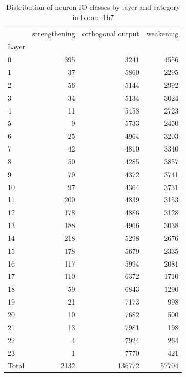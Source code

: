 \begin{table}
\caption{Distribution of neuron IO classes by layer and category in bloom-1b7}
\label{tab:bloom-1b7}
\begin{tabular}{lrrr}
 & strengthening & orthogonal output & weakening \\
Layer &  &  &  \\
0 & 395 & 3241 & 4556 \\
1 & 37 & 5860 & 2295 \\
2 & 56 & 5144 & 2992 \\
3 & 34 & 5134 & 3024 \\
4 & 11 & 5458 & 2723 \\
5 & 9 & 5733 & 2450 \\
6 & 25 & 4964 & 3203 \\
7 & 42 & 4810 & 3340 \\
8 & 50 & 4285 & 3857 \\
9 & 79 & 4372 & 3741 \\
10 & 97 & 4364 & 3731 \\
11 & 200 & 4839 & 3153 \\
12 & 178 & 4886 & 3128 \\
13 & 188 & 4966 & 3038 \\
14 & 218 & 5298 & 2676 \\
15 & 178 & 5679 & 2335 \\
16 & 117 & 5994 & 2081 \\
17 & 110 & 6372 & 1710 \\
18 & 59 & 6843 & 1290 \\
19 & 21 & 7173 & 998 \\
20 & 10 & 7682 & 500 \\
21 & 13 & 7981 & 198 \\
22 & 4 & 7924 & 264 \\
23 & 1 & 7770 & 421 \\
Total & 2132 & 136772 & 57704 \\
\end{tabular}
\end{table}
